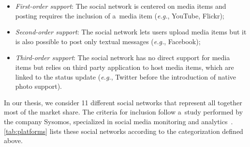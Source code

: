 \begin{itemize}
  \item \emph{First-order support}: The social network is centered on media items and posting requires the inclusion of a~media item (\emph{e.g.}, YouTube, Flickr);
  \item \emph{Second-order support}: The social network lets users upload media items but it is also possible to post only textual messages (\emph{e.g.}, Facebook);
  \item \emph{Third-order support}: The social network has no direct support for media items but relies on third party application to host media items,
which are linked to the status update (\emph{e.g.}, Twitter before the introduction of native photo support).
\end{itemize}

In our thesis, we consider 11 different social networks that represent all together most of the market share.
The criteria for inclusion follow a~study performed by the company Sysomos, specialized in social media monitoring and analytics~\cite{Levine2011}.
\autoref{tab:platforms} lists these social networks according to the categorization defined above.

